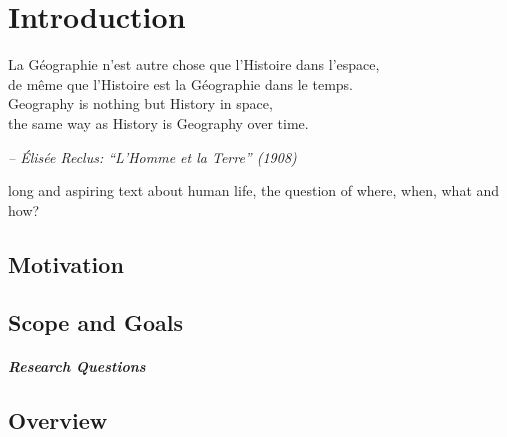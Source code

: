 
\chapter{Introduction} %
\label{sec:introduction}

\begin{quoteit}
\large
La Géographie n’est autre chose que l’Histoire dans l’espace, \\
de même que l’Histoire est la Géographie dans le temps. \\

Geography is nothing but History in space, \\
the same way as History is Geography over time.
\end{quoteit}
\hfill \textit{-- Élisée Reclus: ``L'Homme et la Terre'' (1908)}

long and aspiring text about human life, the question of where, when, what and how?



\section{Motivation} %
\label{sub:motivation}




\section{Scope and Goals} %
\label{sub:goals}





\paragraph{Research Questions} %
\label{par:research_questions}






\section{Overview} %
\label{sub:overview}




